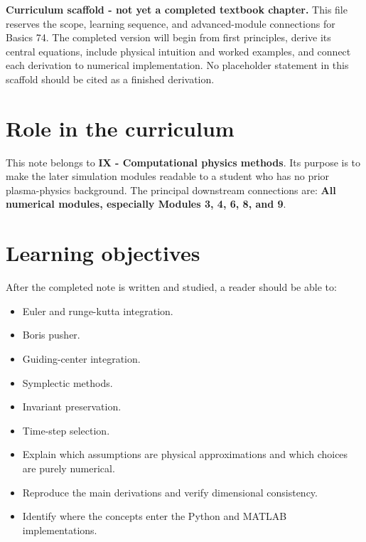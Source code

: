 \documentclass[11pt]{article}
\begin{document}

\begin{overviewbox}
\textbf{Curriculum scaffold - not yet a completed textbook chapter.} This file reserves the scope, learning sequence, and advanced-module connections for Basics 74. The completed version will begin from first principles, derive its central equations, include physical intuition and worked examples, and connect each derivation to numerical implementation. No placeholder statement in this scaffold should be cited as a finished derivation.
\end{overviewbox}

\ProjectTOC

\section{Role in the curriculum}
This note belongs to \textbf{IX - Computational physics methods}. Its purpose is to make the later simulation modules readable to a student who has no prior plasma-physics background. The principal downstream connections are: \textbf{All numerical modules, especially Modules 3, 4, 6, 8, and 9}.

\section{Learning objectives}
After the completed note is written and studied, a reader should be able to:
\begin{itemize}[leftmargin=1.6em]
\item Euler and runge-kutta integration.
\item Boris pusher.
\item Guiding-center integration.
\item Symplectic methods.
\item Invariant preservation.
\item Time-step selection.
\item Explain which assumptions are physical approximations and which choices are purely numerical.
\item Reproduce the main derivations and verify dimensional consistency.
\item Identify where the concepts enter the Python and MATLAB implementations.
\end{itemize}
\end{document}

